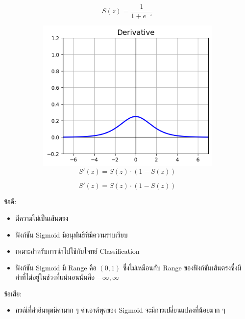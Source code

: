 \begin{itemize}
\begin{figure}[H]
\begin{subfigure}{0.5\textwidth}
{\begin{equation}
                          S(z) = \frac{1} {1 + e^{-z}}
                      \end{equation}
                  }
                  \label{fig:actfunc_sigmoid}
              \end{subfigure}%
              \begin{subfigure}{0.5\textwidth}
                  \centering
                  \includegraphics[width=0.9\linewidth]{fig/actfunc_sigmoid_der.png}
                  \caption{%
                      \begin{equation}
                          S'(z) = S(z) \cdot (1 - S(z))
                      \end{equation}
                  }
                  \label{fig:actfunc_sigmoid_der}
              \end{subfigure}
          \end{figure}

          ข้อดี:
          \begin{itemize}
              \item มีความไม่เป็นเส้นตรง

              \item ฟังก์ชัน Sigmoid มีอนุพันธืที่มีความราบเรียบ

              \item เหมาะสำหรับการนำไปใช้กับโจทย์ Classification

              \item ฟังก์ชัน Sigmoid มี Range คือ $(0,1)$ ซึ่งไม่เหมือนกับ Range ของฟังก์ขันเส้นตรงซึ่งมีค่าที่ไม่อยู่ในช่วงที่แน่นอนนั่นคือ
                    $-\infty, \infty$
          \end{itemize}
          ข้อเสีย:
          \begin{itemize}
              \item กรณีที่ค่าอินพุตมีค่ามาก ๆ ค่าเอาต์พุตของ Sigmoid จะมีการเปลี่ยนแปลงที่น้อยมาก ๆ


\end{itemize}
\end{itemize}
